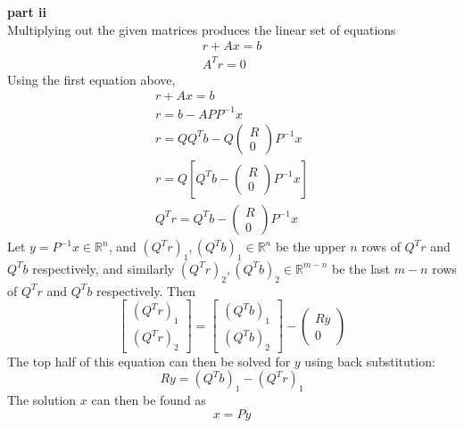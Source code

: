 \documentclass{article} %
\begin{document}
\textbf{part ii} \\
Multiplying out the given matrices produces the linear set of equations
\begin{align*}
r + Ax = b \\
A^T r = 0
\end{align*}
Using the first equation above,
\begin{align*}
r + Ax = b \\
r = b - A P  P^{-1} x \\
r = Q Q^T b - Q \begin{pmatrix} R \\ 0 \end{pmatrix} P^{-1}x \\
r = Q[Q^T b - \begin{pmatrix} R \\ 0 \end{pmatrix} P^{-1}x] \\
Q^T r = Q^T b - \begin{pmatrix} R \\ 0 \end{pmatrix} P^{-1}x 
\end{align*}
Let $y = P^{-1}x \in \mathbb{R}^n$, and $(Q^T r)_1, (Q^T b)_1 \in \mathbb{R}^n$ be the upper $n$ rows of $Q^T r$ and $Q^T b$ respectively, and similarly $(Q^T r)_2, (Q^T b)_2 \in \mathbb{R}^{m-n}$ be the last $m-n$ rows of $Q^T r$ and $Q^T b$ respectively.  Then
\begin{equation*}
\begin{bmatrix} (Q^T r)_1 \\ (Q^T r)_2 \end{bmatrix} = \begin{bmatrix} (Q^T b)_1 \\ (Q^T b)_2 \end{bmatrix} - \begin{pmatrix} R y \\ 0 \end{pmatrix} 
\end{equation*}
The top half of this equation can then be solved for $y$ using back substitution:
\begin{equation*}
Ry = (Q^T b)_1 - (Q^T r)_1
\end{equation*}
The solution $x$ can then be found as 
\begin{equation*}
x = Py
\end{equation*}
\\
 
\end{document}
